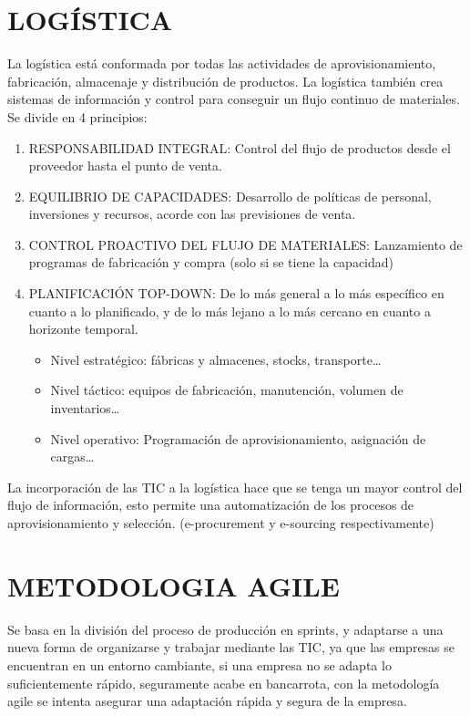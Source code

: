 \documentclass[12pt, twoside, openright]{report} %
\begin{document}
\section{LOGÍSTICA}
La logística está conformada por todas las actividades de aprovisionamiento, fabricación, almacenaje y distribución de productos. La logística también crea sistemas de información y control para conseguir un flujo continuo de materiales. Se divide en 4 principios:
\begin{enumerate}
	\item RESPONSABILIDAD INTEGRAL: Control del flujo de productos desde el proveedor hasta el punto de venta.
	\item EQUILIBRIO DE CAPACIDADES: Desarrollo de políticas de personal, inversiones y recursos, acorde con las previsiones de venta.
	\item CONTROL PROACTIVO DEL FLUJO DE MATERIALES: Lanzamiento de programas de fabricación y compra (solo si se tiene la capacidad)
	\item PLANIFICACIÓN TOP-DOWN: De lo más general a lo más específico en cuanto a lo planificado, y de lo más lejano a lo más cercano en cuanto a horizonte temporal.
	\begin{itemize}
		\item Nivel estratégico: fábricas y almacenes, stocks, transporte…
		\item Nivel táctico: equipos de fabricación, manutención, volumen de inventarios…
		\item Nivel operativo: Programación de aprovisionamiento, asignación de cargas…
	\end{itemize}
\end{enumerate}

La incorporación de las TIC a la logística hace que se tenga un mayor control del flujo de información, esto permite una automatización de los procesos de aprovisionamiento y selección. (e-procurement y e-sourcing respectivamente)

\section{METODOLOGIA AGILE}
Se basa en la división del proceso de producción en sprints, y adaptarse a una nueva forma de organizarse y trabajar mediante las TIC, ya que las empresas se encuentran en un entorno cambiante, si una empresa no se adapta lo suficientemente rápido, seguramente acabe en bancarrota, con la metodología agile se intenta asegurar una adaptación rápida y segura de la empresa.
\end{document}
